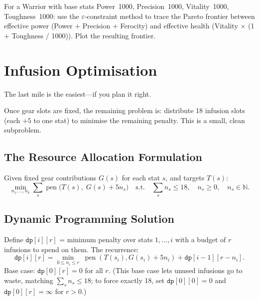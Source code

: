 \documentclass[11pt, a4paper, oneside]{book}
\newcommand{\N}{\mathbb{N}}
\newcommand{\pen}{\operatorname{pen}}
\begin{document}
\begin{exercisebox}
For a Warrior with base stats Power~1000, Precision~1000, Vitality~1000,
Toughness~1000: use the $\varepsilon$-constraint method to trace the
Pareto frontier between effective power (Power + Precision + Ferocity)
and effective health (Vitality $\times$ (1 + Toughness / 1000)).  Plot
the resulting frontier.
\end{exercisebox}

\chapter{Infusion Optimisation}
\label{ch:infusion}

\epigraph{The last mile is the easiest---if you plan it right.}{}

Once gear slots are fixed, the remaining problem is: distribute 18 infusion
slots (each $+5$ to one stat) to minimise the remaining penalty.  This is a
small, clean subproblem.

\section{The Resource Allocation Formulation}

\begin{defbox}[title={Infusion Subproblem}]
Given fixed gear contributions $G(s)$ for each stat $s$, and targets $T(s)$:
\[
  \min_{n_1, \ldots, n_k} \sum_{s} \pen\!\big(T(s),\; G(s) + 5 n_s\big)
  \quad\text{s.t.}\quad
  \sum_s n_s \leq 18, \quad n_s \geq 0, \quad n_s \in \N.
\]
\end{defbox}

\section{Dynamic Programming Solution}

\begin{defbox}[title={Infusion DP}]
Define $\texttt{dp}[i][r]$ = minimum penalty over stats $1, \ldots, i$
with a budget of $r$ infusions to spend on them.  The recurrence:
\[
  \texttt{dp}[i][r] = \min_{0 \leq n_i \leq r} \;
    \pen(T(s_i), G(s_i) + 5 n_i) + \texttt{dp}[i-1][r - n_i].
\]
Base case: $\texttt{dp}[0][r] = 0$ for all $r$.  (This base case lets unused
infusions go to waste, matching $\sum_s n_s \leq 18$; to force exactly
18, set $\texttt{dp}[0][0] = 0$ and $\texttt{dp}[0][r] = \infty$ for $r > 0$.)
\end{defbox}
\end{document}
